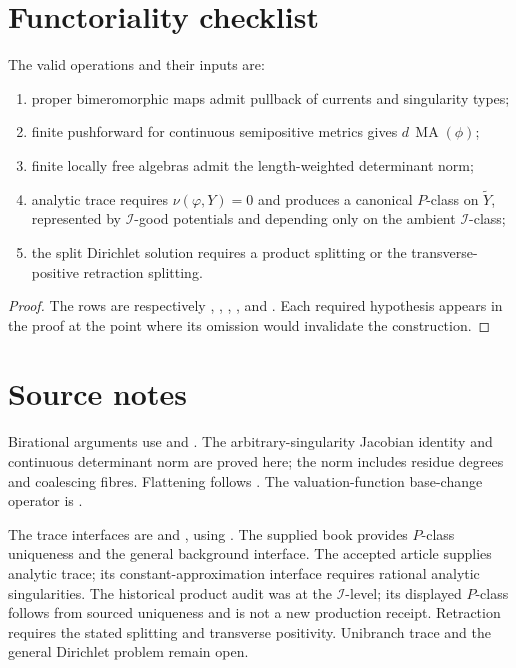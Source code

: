 \section{Functoriality checklist}
\label{sec:functor-checklist}

\begin{proposition}\label{prop:functor-operation-ledger}
The valid operations and their inputs are:
\begin{enumerate}
\item proper bimeromorphic maps admit pullback of currents and
      singularity types;
\item finite pushforward for continuous semipositive metrics gives
      $d\,\operatorname{MA}(\phi)$;
\item finite locally free algebras admit the length-weighted
      determinant norm;
\item analytic trace requires $\nu(\varphi,Y)=0$ and produces a
      canonical $P$-class on $\widetilde Y$, represented by
      $\mathcal I$-good potentials and depending only on the ambient
      $\mathcal I$-class;
\item the split Dirichlet solution requires a product splitting or the
      transverse-positive retraction splitting.
\end{enumerate}
\par
\end{proposition}

\begin{proof}
The rows are respectively
,
,
,
, and
.
Each required hypothesis appears in the proof at the point where its
omission would invalidate the construction.
\end{proof}

\section*{Source notes}
\label{sec:functor-source-notes}

Birational arguments use  and
\cite[Remark~1.7 and Proposition~1.12]{BEGZ10}. The arbitrary-singularity
Jacobian identity and continuous determinant norm are proved here; the norm
includes residue degrees and coalescing fibres. Flattening follows
. The valuation-function base-change operator
is \cite[\S6.3, equation~(6.2)]{BHJ17}.

The trace interfaces are  and
, using
\cite[Corollary~7.1.2 and \S8.1--8.2]{XiaBook}. The supplied book provides
$P$-class uniqueness and the general background interface. The accepted
article supplies analytic trace; its constant-approximation interface
\cite[Example~3.7]{DXTraceV2} requires rational analytic singularities.
The historical product audit was at the $\mathcal I$-level; its displayed
$P$-class follows from sourced uniqueness and is not a new production
receipt. Retraction requires the stated splitting and transverse
positivity. Unibranch trace and the general Dirichlet problem remain open.
